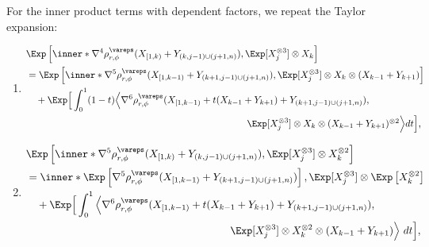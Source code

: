 \documentclass[aos]{imsart}
\begin{document}
\begin{appendix}
For the inner product terms with dependent factors, we repeat the Taylor expansion:
\begin{enumerate}
\item \begin{equation*}
\begin{aligned}
    & \Exp\left[ \inner*{
        \nabla^4 \rho_{r,\phi}^\vareps(X_{[1,k)} + Y_{(k,j-1) \cup (j+1,n)}),
        \Exp[X_j^{\otimes 3}] \otimes X_k
    } \right] \\
    & = \Exp\left[ \inner*{
        \nabla^5 \rho_{r,\phi}^\vareps(X_{[1,k-1)} + Y_{(k+1,j-1) \cup (j+1,n)}),
        \Exp[X_j^{\otimes 3}] \otimes X_k \otimes(X_{k-1} + Y_{k+1})
    } \right] \\
    & \quad + \Exp\Big[ \int_0^1 (1-t) \Big\langle
        \nabla^6 \rho_{r,\phi}^\vareps(X_{[1,k-1)} + t (X_{k-1} + Y_{k+1}) + Y_{(k+1,j-1) \cup (j+1,n)}), \\
    & \omit{\hfill $\Exp[X_j^{\otimes 3}] \otimes X_k \otimes (X_{k-1} + Y_{k+1})^{\otimes 2}
    \Big\rangle dt \Big]$},
\end{aligned}
\end{equation*}

\item \begin{equation*}
\begin{aligned}
    & \Exp\left[ \inner*{
        \nabla^5 \rho_{r,\phi}^\vareps(X_{[1,k)} + Y_{(k,j-1) \cup (j+1,n)}),
        \Exp[X_j^{\otimes 3}] \otimes X_k^{\otimes 2}
    } \right] \\
    & = \inner*{
        \Exp\left[ \nabla^5 \rho_{r,\phi}^\vareps(X_{[1,k-1)} + Y_{(k+1,j-1) \cup (j+1,n)}) \right],
        \Exp[X_j^{\otimes 3}] \otimes \Exp\left[ X_k^{\otimes 2} \right]
    }  \\
    & \quad + \Exp\Big[ \int_0^1 \Big\langle
        \nabla^6 \rho_{r,\phi}^\vareps(X_{[1,k-1)} + t (X_{k-1} + Y_{k+1}) + Y_{(k+1,j-1) \cup (j+1,n)}), \\
    & \omit{\hfill $\Exp[X_j^{\otimes 3}] \otimes X_k^{\otimes 2} \otimes (X_{k-1} + Y_{k+1})
    \Big\rangle ~dt \Big],$}
\end{aligned}
\end{equation*}


\end{enumerate}
\end{appendix}
\end{document}
